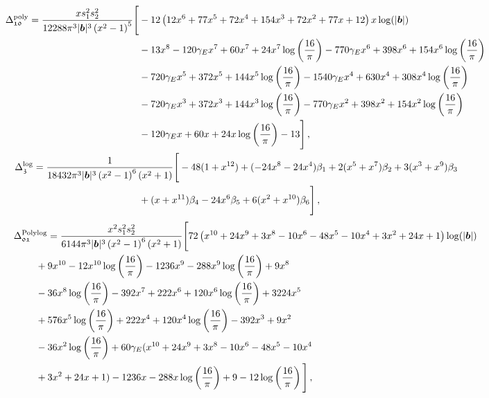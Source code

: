 \begin{thesiscompactdisplay}[\scriptsize]
\begin{align}
\begin{split}
\Delta_{\mathfrak{10}}^{\textrm{poly}}=\frac{xs_1^2 s_2^2}{12288 \pi ^3 |\boldsymbol{b}|^3 \left(x^2-1\right)^5 }\Bigg[&-12 \left(12 x^6+77 x^5+72 x^4+154 x^3+72 x^2+77 x+12\right) x \log(|\boldsymbol{b}|)\\
&-13 x^8-120 \gamma_E  x^7+60 x^7+24 x^7 \log \left(\frac{16}{\pi }\right)-770 \gamma_E  x^6+398 x^6+154 x^6 \log \left(\frac{16}{\pi }\right)\\
&-720 \gamma_E  x^5+372 x^5+144 x^5 \log \left(\frac{16}{\pi }\right)-1540 \gamma_E  x^4+630 x^4+308 x^4 \log \left(\frac{16}{\pi }\right)\\
&-720 \gamma_E  x^3+372 x^3+144 x^3 \log \left(\frac{16}{\pi }\right)-770 \gamma_E  x^2+398 x^2+154 x^2 \log \left(\frac{16}{\pi }\right)\\
&-120 \gamma_E  x+60 x+24 x \log \left(\frac{16}{\pi }\right)-13\Bigg]\,,\\ &
\hspace{-4.5 cm}\Delta_{\mathfrak{3}}^{\textrm{log}}=\frac{1}{18432 \pi ^3 |\boldsymbol{b}|^3 \left(x^2-1\right)^6 \left(x^2+1\right) }\Bigg[-48(1+x^{12})+(-24 x^8-24 x^4)\beta_1+2(x^5+x^7)\beta_2+3(x^3+x^9)\beta_3\\
& +(x+x^{11})\beta_4-24x^6\beta_5+6(x^2+x^{10})\beta_6\Bigg]\,,\nonumber
\end{split}
\end{align}
\begin{align}
\begin{split}
&\Delta_{\mathfrak{01}}^{\textrm{Polylog}}=\frac{x^2s_1^2 s_2^2}{6144 \pi ^3 |\boldsymbol{b}|^3 \left(x^2-1\right)^6 \left(x^2+1\right) }\Bigg[72 \left(x^{10}+24 x^9+3 x^8-10 x^6-48 x^5-10 x^4+3 x^2+24 x+1\right) \log(|\boldsymbol{b}|)\\ &\hspace{0.8cm}+9 x^{10}-12 x^{10} \log \left(\frac{16}{\pi }\right)-1236 x^9-288 x^9 \log \left(\frac{16}{\pi }\right)+9 x^8\\ &\hspace{0.8cm}-36 x^8 \log \left(\frac{16}{\pi }\right)-392 x^7+222 x^6+120 x^6 \log \left(\frac{16}{\pi }\right)+3224 x^5\\ &\hspace{0.8cm}+576 x^5 \log \left(\frac{16}{\pi }\right)+222 x^4+120 x^4 \log \left(\frac{16}{\pi }\right)-392 x^3+9 x^2\\ &\hspace{0.8cm}-36 x^2 \log \left(\frac{16}{\pi }\right)+60 \gamma_E  (x^{10}+24 x^9+3 x^8-10 x^6-48 x^5-10 x^4\\ &\hspace{0.8cm}+3 x^2+24 x+1)-1236 x-288 x \log \left(\frac{16}{\pi }\right)+9-12 \log \left(\frac{16}{\pi }\right)\Bigg]\,,\\

\end{split}
\end{align}
\end{thesiscompactdisplay}
